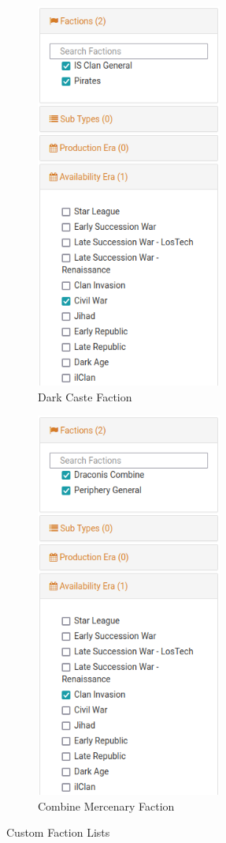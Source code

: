 \begin{figure}[!h]
  \centering
  \begin{subfigure}{0.4\textwidth}
    \centering
    \includegraphics[height=5.0in]{../img/Dark_Caste_List.png}
    \caption*{Dark Caste Faction}
  \end{subfigure}
  \hspace{1in}
  \begin{subfigure}{0.4\textwidth}
    \centering
    \includegraphics[height=5.0in]{../img/Combine_Mercenary_List.png}
    \caption*{Combine Mercenary Faction}
  \end{subfigure}
  \caption*{Custom Faction Lists}
\end{figure}

